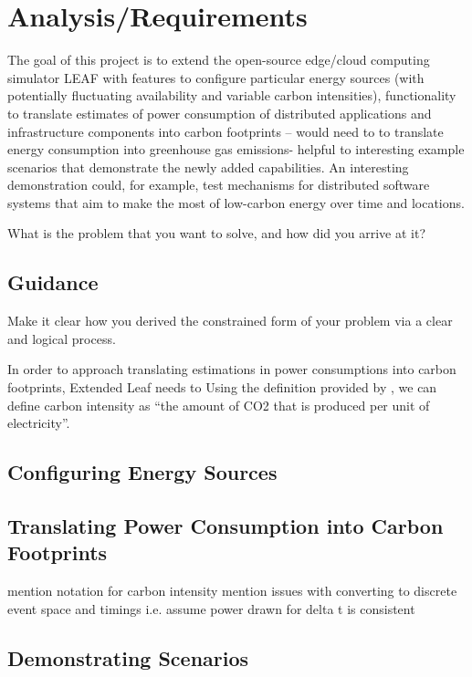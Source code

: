 \documentclass{l4proj}
\begin{document}
\chapter{Analysis/Requirements}\label{ch:analysis/requirements}
The goal of this project is to extend the open-source edge/cloud computing simulator LEAF with
features to configure particular energy sources (with potentially fluctuating availability and variable carbon intensities),
functionality to translate estimates of power consumption of distributed applications and infrastructure components into carbon footprints – would need to to translate energy consumption into greenhouse gas emissions- helpful to
interesting example scenarios that demonstrate the newly added capabilities.
An interesting demonstration could, for example, test mechanisms for distributed software systems that aim to make the most of low-carbon energy over time and locations.

What is the problem that you want to solve, and how did you arrive at it?
\section{Guidance}
Make it clear how you derived the constrained form of your problem via a clear and logical process. 

In order to approach translating estimations in power consumptions into carbon footprints, Extended Leaf needs to
Using the definition provided by \cite{owid-electricity-mix}, we can define carbon intensity as ``the amount of CO2 that is produced per unit of electricity''.
\section{Configuring Energy Sources}
\section{Translating Power Consumption into Carbon Footprints}
mention notation for carbon intensity
mention issues with converting to discrete event space and timings i.e. assume power drawn for delta t is consistent
\section{Demonstrating Scenarios}
\end{document}
